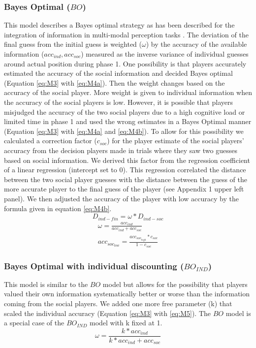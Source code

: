 \documentclass[jou]{apa}
\begin{document}
\subsubsection{Bayes Optimal ($BO$)}
This model describes a Bayes optimal strategy as has been described for the integration of information in multi-modal perception tasks  \cite{alais_ventriloquist_2004}. The deviation of the final guess from the initial guess is weighted ($\omega$) by the accuracy of the available information ($acc_{ind}, acc_{soc}$) measured as the inverse variance of individual guesses around actual position during phase 1. One possibility is that players accurately estimated the accuracy of the social information and decided Bayes optimal (Equation \ref{eq:M3} with \ref{eq:M4a}). Then the weight changes based on the accuracy of the social player. More weight is given to individual information when the accuracy of the social players is low. However, it is possible that players misjudged the accuracy of the two social players due to a high cognitive load or limited time in phase 1 and used the wrong estimates in a Bayes Optimal manner (Equation \ref{eq:M3} with \ref{eq:M4a} and \ref{eq:M4b}). To allow for this possibility we calculated a correction factor ($c_{soc}$) for the player estimate of the social players' accuracy from the decision players made in trials where they saw two guesses based on social information. We derived this factor from the regression coefficient of a linear regression (intercept set to 0). This regression correlated the distance between the two social player guesses with the distance between the guess of the more accurate player to the final guess of the player (see Appendix 1 upper left panel). We then adjusted the accuracy of the player with low accuracy by the formula given in equation \ref{eq:M4b}.
\begin{equation}
D_{ind-fin}=\omega * D_{ind-soc}
\label{eq:M3}
\end{equation} 
\begin{subequations}
\begin{align}
\omega=\frac{acc_{ind}}{acc_{ind}+acc_{soc}}\label{eq:M4a}\\
acc_{soc_{low}}=\frac{acc_{soc_{high}}*c_{soc}}{1-c_{soc}}\label{eq:M4b}
\end{align}
\end{subequations}
\subsubsection{Bayes Optimal with individual discounting ($BO_{IND}$)}
This model is similar to the $BO$ model but allows for the possibility that players valued their own information systematically better or worse than the information coming from the social players. We added one more free parameter (k) that scaled the individual accuracy (Equation \ref{eq:M3} with \ref{eq:M5}). The $BO$ model is a special case of the $BO_{IND}$ model with k fixed at 1.
\begin{equation}
\omega=\frac{k*acc_{ind}}{k*acc_{ind}+acc_{soc}}\label{eq:M5}
\end{equation}
\end{document}
